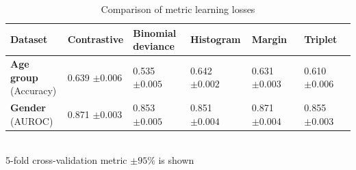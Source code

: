 \documentclass{article}
\begin{document}
\begin{table}
\centering
\caption{Comparison of metric learning losses}
\begin{tabular}{llllll}
\toprule
\textbf{Dataset} & \textbf{Contrastive} & \makecell{\textbf{Binomial} \\ \textbf{deviance}} & \textbf{Histogram} & \textbf{Margin} & \textbf{Triplet} \\
\midrule
\makecell{\textbf{Age group} \\ \small{(Accuracy)}} & \makecell{0.639 \\ $\pm 0.006$} & \makecell{0.535 \\ $\pm 0.005$} & \makecell{0.642 \\ $\pm 0.002$} & \makecell{0.631 \\ $\pm 0.003$} & \makecell{0.610 \\ $\pm 0.006$} \\
\makecell{\textbf{Gender} \\ \small{(AUROC)}} & \makecell{0.871 \\ $\pm 0.003$} & \makecell{0.853 \\ $\pm 0.005$} & \makecell{0.851 \\ $\pm 0.004$} & \makecell{0.871 \\ $\pm 0.004$} & \makecell{0.855 \\ $\pm 0.003$} \\
\bottomrule
\end{tabular} \\
\small{5-fold cross-validation metric $\pm 95\%$ is shown}
\label{tab-loss-type}
\end{table}
\end{document}
